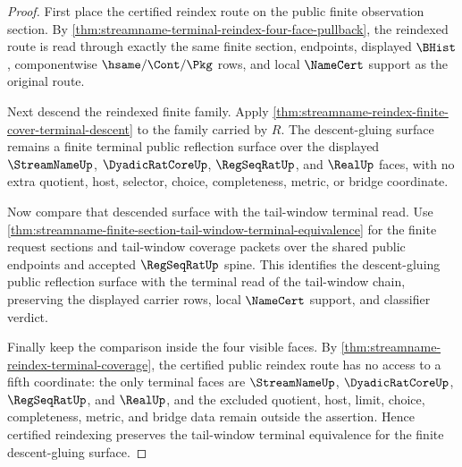 \begin{proof}
First place the certified reindex route on the public finite observation
section. By
\autoref{thm:streamname-terminal-reindex-four-face-pullback}, the reindexed
route is read through exactly the same finite section, endpoints, displayed
$\BHist$, componentwise $\hsame/\Cont/\Pkg$ rows, and local $\NameCert$
support as the original route.

Next descend the reindexed finite family. Apply
\autoref{thm:streamname-reindex-finite-cover-terminal-descent} to the family
carried by $R$. The descent-gluing surface remains a finite terminal public
reflection surface over the displayed $\StreamNameUp$, $\DyadicRatCoreUp$,
$\RegSeqRatUp$, and $\RealUp$ faces, with no extra quotient, host, selector,
choice, completeness, metric, or bridge coordinate.

Now compare that descended surface with the tail-window terminal read. Use
\autoref{thm:streamname-finite-section-tail-window-terminal-equivalence} for
the finite request sections and tail-window coverage packets over the shared
public endpoints and accepted $\RegSeqRatUp$ spine. This identifies the
descent-gluing public reflection surface with the terminal read of the
tail-window chain, preserving the displayed carrier rows, local $\NameCert$
support, and classifier verdict.

Finally keep the comparison inside the four visible faces. By
\autoref{thm:streamname-reindex-terminal-coverage}, the certified public
reindex route has no access to a fifth coordinate: the only terminal faces
are $\StreamNameUp$, $\DyadicRatCoreUp$, $\RegSeqRatUp$, and $\RealUp$, and
the excluded quotient, host, limit, choice, completeness, metric, and bridge
data remain outside the assertion. Hence certified reindexing preserves the
tail-window terminal equivalence for the finite descent-gluing surface.
\end{proof}


